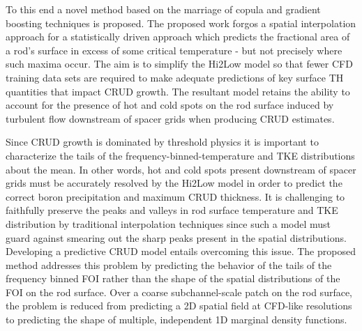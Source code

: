 To this end a novel method based on the marriage of copula and gradient
boosting techniques is proposed.  The proposed work forgos a spatial
interpolation approach for a statistically driven approach which predicts the
fractional area of a rod's surface in excess of some critical temperature - but
not precisely where such maxima occur.  The aim is to simplify the Hi2Low model
so that fewer CFD training data sets are required to make adequate predictions
of key surface TH quantities that impact CRUD growth.  The resultant model
retains the ability to account for the presence of hot and cold spots on the rod surface induced by
turbulent flow downstream of spacer grids when producing CRUD estimates.

Since CRUD growth is dominated by threshold physics
it is important to characterize the tails of the
frequency-binned-temperature and TKE distributions about the mean.  In other
words, hot and cold spots present downstream of spacer grids must be accurately
resolved by the Hi2Low model in order to predict the correct boron
precipitation and maximum CRUD thickness.
It is challenging to faithfully
preserve the peaks and valleys in rod surface temperature and TKE distribution
by traditional interpolation techniques since such a model must guard against
smearing out the sharp peaks present in the spatial distributions.  Developing
a predictive CRUD model entails overcoming this issue. The proposed method
addresses this problem by predicting the behavior of the tails of the frequency
binned FOI rather than the shape of the spatial distributions of the FOI on
the rod surface.  Over a coarse subchannel-scale patch on the rod surface, the
problem is reduced from predicting a 2D spatial field at CFD-like resolutions to
predicting the shape of multiple, independent 1D marginal density functions.
